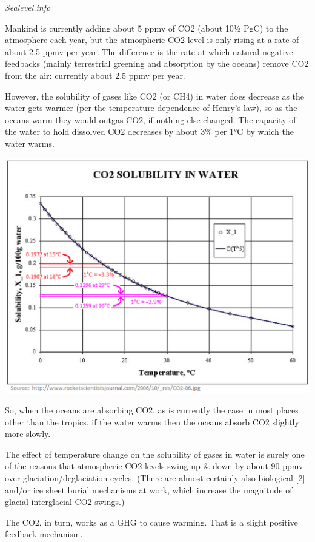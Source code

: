 \documentclass[
]{book}
\begin{document}
\emph{Sealevel.info}

Mankind is currently adding about 5 ppmv of CO2 (about 10½ PgC) to the atmosphere each year, but the atmospheric CO2 level is only rising at a rate of about 2.5 ppmv per year. The difference is the rate at which natural negative feedbacks (mainly terrestrial greening and absorption by the oceans) remove CO2 from the air: currently about 2.5 ppmv per year.

However, the solubility of gases like CO2 (or CH4) in water does decrease as the water gets warmer (per the temp­er­a­ture depen­dence of Henry's law), so as the oceans warm they would outgas CO2, if nothing else changed. The capacity of the water to hold dissolved CO2 decreases by about 3\% per 1°C by which the water warms.

\includegraphics{fig/CO2_solubility_in_water.png}

So, when the oceans are absorbing CO2, as is currently the case in most places other than the tropics, if the water warms then the oceans absorb CO2 slightly more slowly.

The effect of temperature change on the solubility of gases in water is surely one of the reasons that atmospheric CO2 levels swing up \& down by about 90 ppmv over glaciation/deglaciation cycles. (There are almost certainly also biological {[}2{]} and/or ice sheet burial mechanisms at work, which increase the magnitude of glacial-interglacial CO2 swings.)

The CO2, in turn, works as a GHG to cause warming. That is a slight positive feedback mechanism.
\end{document}
